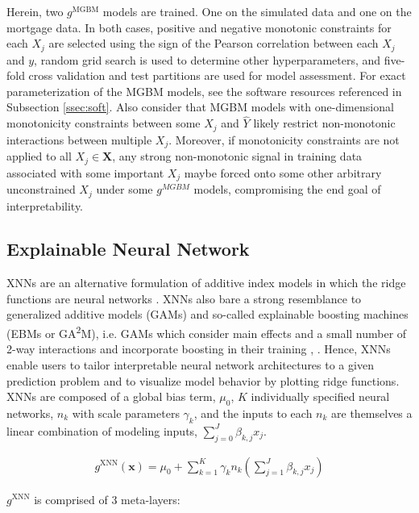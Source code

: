 \documentclass[information,article,submit,moreauthors,pdftex]{definitions/mdpi}
\begin{document}
Herein, two $g^\text{MGBM}$ models are trained.  One on the simulated data and one on the mortgage data. In both cases, positive and negative monotonic constraints for each $X_j$ are selected using the sign of the Pearson correlation between each $X_j$ and $y$, random grid search is used to determine other hyperparameters, and five-fold cross validation and test partitions are used for model assessment. For exact parameterization of the MGBM models, see the software resources referenced in Subsection \ref{ssec:soft}. Also consider that MGBM models with one-dimensional monotonicity constraints between some $X_j$ and $\hat{Y}$ likely restrict non-monotonic interactions between multiple $X_j$. Moreover, if monotonicity constraints are not applied to all $X_j \in \mathbf{X}$, any strong non-monotonic signal in training data associated with some important $X_j$ maybe forced onto some other arbitrary unconstrained $X_j$ under some $g^{MGBM}$ models, compromising the end goal of interpretability. 

\subsection{Explainable Neural Network}\label{ssec:xnn}

XNNs are an alternative formulation of additive index models in which the ridge functions are neural networks \cite{wf_xnn}. XNNs also bare a strong resemblance to generalized additive models (GAMs) and so-called explainable boosting machines (EBMs or GA\textsuperscript{2}M), i.e. GAMs which consider main effects and a small number of 2-way interactions and incorporate boosting in their training \cite{esl}, \cite{ga2m}.  Hence, XNNs enable users to tailor interpretable neural network architectures to a given prediction problem and to visualize model behavior by plotting ridge functions. XNNs are composed of a global bias term, $\mu_0$, $K$ individually specified neural networks, $n_k$ with scale parameters $\gamma_k$, and the inputs to each $n_k$ are themselves a linear combination of modeling inputs, $\sum^J_{j=0}\beta_{k, j}x_j$.

\begin{equation}
\begin{aligned}
\label{eq:xnn}
g^{\text{XNN}}(\mathbf{x}) = \mu_0 + \sum_{k=1}^K\gamma_k n_k(\sum^J_{j=1}\beta_{k, j}x_j)
\end{aligned}
\end{equation}

\noindent $g^{\text{XNN}}$ is comprised of 3 meta-layers:
\end{document}
